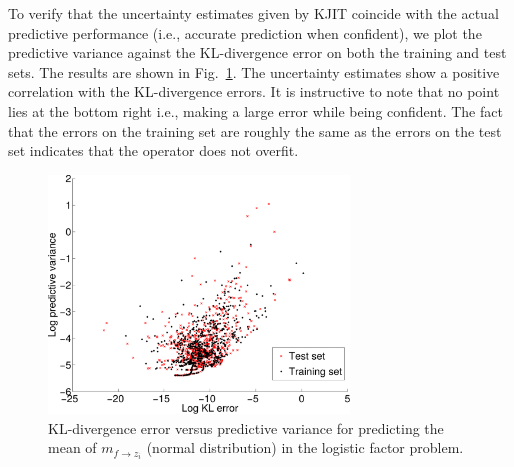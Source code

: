 \documentclass[english]{article}
\theoremstyle{plain}
\theoremstyle{plain}
\newcommand{\figref}[1]{Fig.~\ref{#1}}
\begin{document}



To verify that the uncertainty estimates given by KJIT coincide with the actual 
predictive performance (i.e., accurate prediction when confident), we plot the 
predictive variance against the KL-divergence error on both the training and
test sets. The results are shown in \figref{fig:logistic_predvar_g}.
%
The uncertainty estimates show a positive correlation with the KL-divergence errors. 
It is instructive to note that no point lies at the bottom right i.e., making a
large error while being confident. 
The fact that the errors on the training set are roughly the same as the errors
on the test set indicates that the operator does not overfit.

\begin{figure}[t]
  \centering
  \includegraphics[width=8cm]{img/pred_var/fm_kgg_joint_-bw-out1-crop}
  \caption{KL-divergence error versus predictive variance for predicting the 
  mean of $m_{f \rightarrow z_i}$ (normal distribution) in the logistic factor problem. }
  \label{fig:logistic_predvar_g}
\end{figure}


\end{document}
